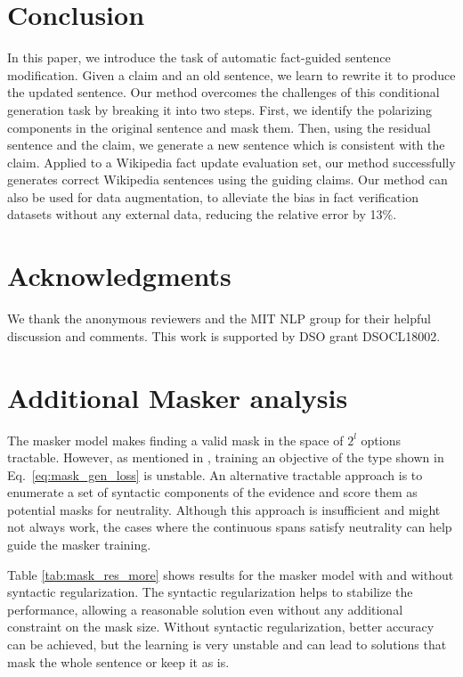 \documentclass[letterpaper]{article} %
\renewcommand{\eqref}[1]{Eq.~\ref{#1}}
\begin{document}
\section{Conclusion}
\label{sec:discussion}
In this paper, we introduce the task of automatic fact-guided sentence modification. Given a claim and an old sentence, we learn to rewrite it to produce the updated sentence. Our method overcomes the challenges of this conditional generation task by breaking it into two steps. First, we identify the polarizing components in the original sentence and mask them. Then, using the residual sentence and the claim, we generate a new sentence which is consistent with the claim. Applied to a Wikipedia fact update evaluation set, our method successfully generates correct Wikipedia sentences using the guiding claims. Our method can also be used for data augmentation, to alleviate the bias in fact verification datasets without any external data, reducing the relative error by 13\%.
\section{Acknowledgments}
We thank the anonymous reviewers and the MIT NLP group for their helpful discussion and comments.
This work is supported by DSO grant DSOCL18002.





\newpage
\appendix

\section{Additional Masker analysis}
\label{app:masker}

The masker model makes finding a valid mask in the space of $2^l$ options tractable. However, as mentioned in \cite{bao-etal-2018-deriving}, training an objective of the type shown in \eqref{eq:mask_gen_loss} is unstable. An alternative tractable approach is to enumerate a set of syntactic components of the evidence and score them as potential masks for neutrality. Although this approach is insufficient and might not always work, the cases where the continuous spans satisfy neutrality can help guide the masker training.

Table \ref{tab:mask_res_more} shows results for the masker model with and without syntactic regularization. The syntactic regularization helps to stabilize the performance, allowing a reasonable solution even without any additional constraint on the mask size. Without syntactic regularization, better accuracy can be achieved, but the learning is very unstable and can lead to solutions that mask the whole sentence or keep it as is.
\end{document}
